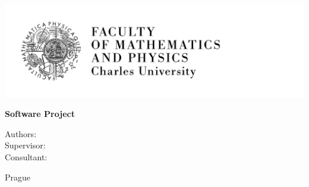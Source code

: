 

\pagestyle{empty}
\hypersetup{pageanchor=false}
\begin{center}

\centerline{\mbox{\includegraphics[width=166mm]{img/logo-en.pdf}}}

\vspace{-8mm}
\vfill

{\bf\Large Software Project}

\vfill


{\huge\bfseries\ProjectTitle}
 
\vspace{4mm}

{\LARGE\bfseries\ProjectTag}

\vfill

\vspace{30mm}

{
\centerline{\vbox{
Authors: \ProjectAuthors\\
{\vspace{2mm}}
Supervisor: \Supervisor\\
{\vspace{2mm}}
Consultant: \Consultant\\
}}}

\vfill

{\normalsize\Faculty}

{\normalsize\University}

{\normalsize Prague \YearSubmitted}

\end{center}

\newpage

\openright
\pagestyle{plain}
\setcounter{page}{1}
